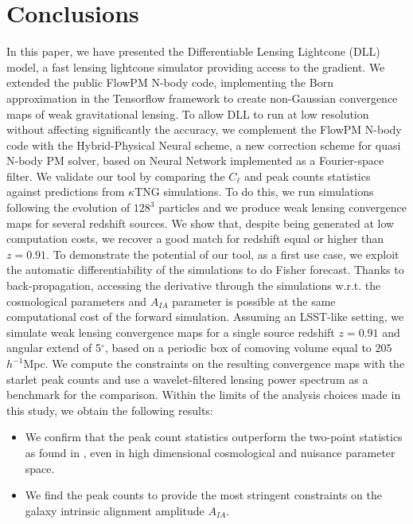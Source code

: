 \documentclass[twocolumn,twocolappendix]{aastex63}
\begin{document}
\section{Conclusions}\label{Conclusions}
In this paper, we have presented the Differentiable Lensing Lightcone (DLL) model, a fast lensing lightcone simulator providing access to the gradient. 
We extended the public FlowPM N-body code, implementing the Born approximation in the Tensorflow framework to create non-Gaussian convergence maps of weak gravitational lensing. To allow DLL to run at low resolution without affecting significantly the accuracy, we complement the FlowPM N-body code with the Hybrid-Physical Neural scheme, a new correction scheme for quasi N-body PM solver, based on Neural Network implemented as a Fourier-space filter. 
We validate our tool by comparing the $C_{\ell}$ and peak counts statistics against predictions from $\kappa$TNG simulations. 
To do this, we run simulations following the evolution of $128^3$ particles and we produce weak lensing convergence maps for several redshift sources. 
We show that, despite being generated at low computation costs, we recover a good match for redshift equal or higher than $z=0.91$. 
To demonstrate the potential of our tool, as a first use case, we exploit the automatic differentiability of the simulations to do Fisher forecast. 
Thanks to back-propagation, accessing the derivative through the simulations w.r.t. the cosmological parameters and $A_{IA}$ parameter is possible at the same computational cost of the forward simulation.
Assuming an LSST-like setting, we simulate weak lensing convergence maps for a single source redshift $z=0.91$ and angular extend of 5$^\circ$, based on a periodic box of
comoving volume equal to  $205$ $h^{-1}$Mpc.
We compute the constraints on the resulting convergence maps
with the starlet peak counts and use a wavelet-filtered lensing power spectrum as a benchmark for the comparison.
 Within the limits of the analysis choices made in this study, we obtain the following results:
\begin{itemize}
    \item  We confirm that the peak count statistics outperform the two-point statistics as found in \cite{ajani2020constraining},
 even in high dimensional cosmological and nuisance parameter space.
    \item We find the peak counts to provide the most stringent constraints on the galaxy intrinsic alignment amplitude $A_{IA}$. 
\end{itemize}
\end{document}
